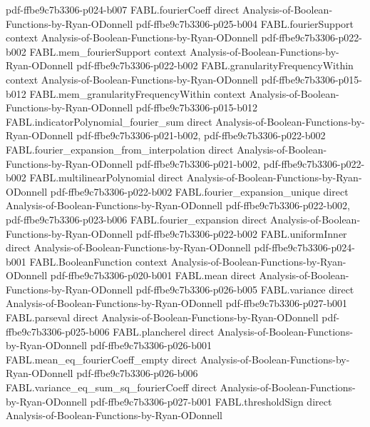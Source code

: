 \begin{theorem}
{    pdf-ffbe9c7b3306-p024-b007}
\proofstep
  {FABL.fourierCoeff}
  {direct}
  {Analysis-of-Boolean-Functions-by-Ryan-ODonnell}
  {pdf-ffbe9c7b3306-p025-b004}
\proofstep
  {FABL.fourierSupport}
  {context}
  {Analysis-of-Boolean-Functions-by-Ryan-ODonnell}
  {pdf-ffbe9c7b3306-p022-b002}
\proofstep
  {FABL.mem_fourierSupport}
  {context}
  {Analysis-of-Boolean-Functions-by-Ryan-ODonnell}
  {pdf-ffbe9c7b3306-p022-b002}
\proofstep
  {FABL.granularityFrequencyWithin}
  {context}
  {Analysis-of-Boolean-Functions-by-Ryan-ODonnell}
  {pdf-ffbe9c7b3306-p015-b012}
\proofstep
  {FABL.mem_granularityFrequencyWithin}
  {context}
  {Analysis-of-Boolean-Functions-by-Ryan-ODonnell}
  {pdf-ffbe9c7b3306-p015-b012}
\proofstep
  {FABL.indicatorPolynomial_fourier_sum}
  {direct}
  {Analysis-of-Boolean-Functions-by-Ryan-ODonnell}
  {pdf-ffbe9c7b3306-p021-b002,
    pdf-ffbe9c7b3306-p022-b002}
\proofstep
  {FABL.fourier_expansion_from_interpolation}
  {direct}
  {Analysis-of-Boolean-Functions-by-Ryan-ODonnell}
  {pdf-ffbe9c7b3306-p021-b002,
    pdf-ffbe9c7b3306-p022-b002}
\proofstep
  {FABL.multilinearPolynomial}
  {direct}
  {Analysis-of-Boolean-Functions-by-Ryan-ODonnell}
  {pdf-ffbe9c7b3306-p022-b002}
\proofstep
  {FABL.fourier_expansion_unique}
  {direct}
  {Analysis-of-Boolean-Functions-by-Ryan-ODonnell}
  {pdf-ffbe9c7b3306-p022-b002,
    pdf-ffbe9c7b3306-p023-b006}
\proofstep
  {FABL.fourier_expansion}
  {direct}
  {Analysis-of-Boolean-Functions-by-Ryan-ODonnell}
  {pdf-ffbe9c7b3306-p022-b002}
\proofstep
  {FABL.uniformInner}
  {direct}
  {Analysis-of-Boolean-Functions-by-Ryan-ODonnell}
  {pdf-ffbe9c7b3306-p024-b001}
\proofstep
  {FABL.BooleanFunction}
  {context}
  {Analysis-of-Boolean-Functions-by-Ryan-ODonnell}
  {pdf-ffbe9c7b3306-p020-b001}
\proofstep
  {FABL.mean}
  {direct}
  {Analysis-of-Boolean-Functions-by-Ryan-ODonnell}
  {pdf-ffbe9c7b3306-p026-b005}
\proofstep
  {FABL.variance}
  {direct}
  {Analysis-of-Boolean-Functions-by-Ryan-ODonnell}
  {pdf-ffbe9c7b3306-p027-b001}
\proofstep
  {FABL.parseval}
  {direct}
  {Analysis-of-Boolean-Functions-by-Ryan-ODonnell}
  {pdf-ffbe9c7b3306-p025-b006}
\proofstep
  {FABL.plancherel}
  {direct}
  {Analysis-of-Boolean-Functions-by-Ryan-ODonnell}
  {pdf-ffbe9c7b3306-p026-b001}
\proofstep
  {FABL.mean_eq_fourierCoeff_empty}
  {direct}
  {Analysis-of-Boolean-Functions-by-Ryan-ODonnell}
  {pdf-ffbe9c7b3306-p026-b006}
\proofstep
  {FABL.variance_eq_sum_sq_fourierCoeff}
  {direct}
  {Analysis-of-Boolean-Functions-by-Ryan-ODonnell}
  {pdf-ffbe9c7b3306-p027-b001}
\proofstep
  {FABL.thresholdSign}
  {direct}
  {Analysis-of-Boolean-Functions-by-Ryan-ODonnell}

\end{theorem}
